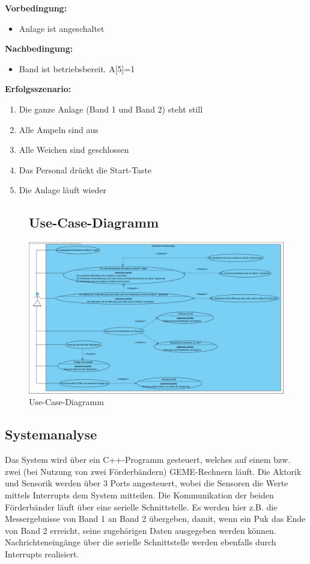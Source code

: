\documentclass[oneside,a4paper,titlepage]{scrartcl}              %
\begin{document}
\textbf{Vorbedingung:}
\begin{itemize}
  \item Anlage ist angeschaltet
\end{itemize}

\textbf{Nachbedingung:}
\begin{itemize}
  \item Band ist betriebsbereit. A[5]=1
\end{itemize}

\textbf{Erfolgsszenario:}
\begin{enumerate}
  \item Die ganze Anlage (Band 1 und Band 2) steht still
  \item Alle Ampeln sind aus
  \item Alle Weichen sind geschlossen
  \item Das Personal drückt die Start-Taste
  \item Die Anlage läuft wieder
\end{enumerate}

\begin{figure}[p]
  \subsection{Use-Case-Diagramm}
  \centering\includegraphics[angle=90,scale=0.7]{imgs/UseCases.png}
  \caption{Use-Case-Diagramm}
\end{figure}

\subsection{Systemanalyse}
Das System wird über ein C++-Programm gesteuert, welches auf einem bzw. zwei (bei Nutzung von zwei Förderbändern) GEME-Rechnern läuft. Die Aktorik und Sensorik werden über 3 Ports angesteuert, wobei die Sensoren die Werte mittels Interrupts dem System mitteilen.\newline
Die Kommunikation der beiden Förderbänder läuft über eine serielle Schnittstelle. Es werden hier z.B. die Messergebnisse von Band 1 an Band 2 übergeben, damit, wenn ein Puk das Ende von Band 2 erreicht, seine zugehörigen Daten ausgegeben werden können. Nachrichteneingänge über die serielle Schnittstelle werden ebenfalls durch Interrupts realisiert.
\end{document}
